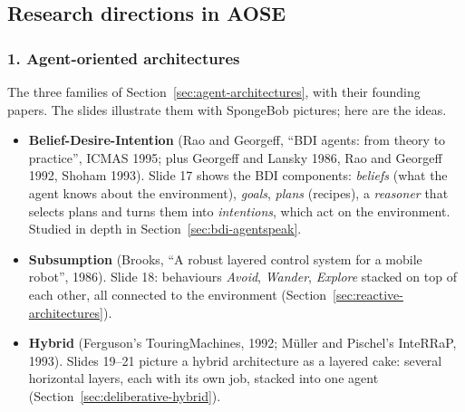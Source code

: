 \subsection{Research directions in AOSE}
\label{sec:research-directions}

\subsubsection{1. Agent-oriented architectures}

The three families of Section~\ref{sec:agent-architectures}, with their founding papers.
The slides illustrate them with SpongeBob pictures; here are the ideas.
\begin{itemize}
  \item \textbf{Belief-Desire-Intention} (Rao and Georgeff, ``BDI agents: from theory to
        practice'', ICMAS 1995; plus Georgeff and Lansky 1986, Rao and Georgeff 1992,
        Shoham 1993). Slide 17 shows the BDI components: \emph{beliefs} (what the agent
        knows about the environment), \emph{goals}, \emph{plans} (recipes), a
        \emph{reasoner} that selects plans and turns them into \emph{intentions}, which act
        on the environment. Studied in depth in Section~\ref{sec:bdi-agentspeak}.
  \item \textbf{Subsumption} (Brooks, ``A robust layered control system for a mobile
        robot'', 1986). Slide 18: behaviours \emph{Avoid}, \emph{Wander}, \emph{Explore}
        stacked on top of each other, all connected to the environment
        (Section~\ref{sec:reactive-architectures}).
  \item \textbf{Hybrid} (Ferguson's TouringMachines, 1992; M\"uller and Pischel's InteRRaP,
        1993). Slides 19--21 picture a hybrid architecture as a layered cake: several
        horizontal layers, each with its own job, stacked into one agent
        (Section~\ref{sec:deliberative-hybrid}).
\end{itemize}

